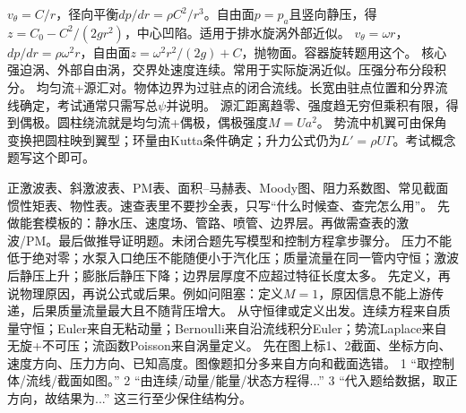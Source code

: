 $v_\theta=C/r$，径向平衡$dp/dr=\rho C^2/r^3$。自由面$p=p_a$且竖向静压，得$z=C_0-C^2/(2gr^2)$，中心凹陷。适用于排水旋涡外部近似。
$v_\theta=\omega r$，$dp/dr=\rho\omega^2r$，自由面$z=\omega^2r^2/(2g)+C$，抛物面。容器旋转题用这个。
核心强迫涡、外部自由涡，交界处速度连续。常用于实际旋涡近似。压强分布分段积分。
均匀流+源汇对。物体边界为过驻点的闭合流线。长宽由驻点位置和分界流线确定，考试通常只需写总$\psi$并说明。
源汇距离趋零、强度趋无穷但乘积有限，得到偶极。圆柱绕流就是均匀流+偶极，偶极强度$M=Ua^2$。
势流中机翼可由保角变换把圆柱映到翼型；环量由Kutta条件确定；升力公式仍为$L'=\rho U\Gamma$。考试概念题写这个即可。

正激波表、斜激波表、PM表、面积--马赫表、Moody图、阻力系数图、常见截面惯性矩表、物性表。速查表里不要抄全表，只写“什么时候查、查完怎么用”。
先做能套模板的：静水压、速度场、管路、喷管、边界层。再做需查表的激波/PM。最后做推导证明题。未闭合题先写模型和控制方程拿步骤分。
压力不能低于绝对零；水泵入口绝压不能随便小于汽化压；质量流量在同一管内守恒；激波后静压上升；膨胀后静压下降；边界层厚度不应超过特征长度太多。
先定义，再说物理原因，再说公式或后果。例如问阻塞：定义$M=1$，原因信息不能上游传递，后果质量流量最大且不随背压增大。
从守恒律或定义出发。连续方程来自质量守恒；Euler来自无粘动量；Bernoulli来自沿流线积分Euler；势流Laplace来自无旋+不可压；流函数Poisson来自涡量定义。
先在图上标1、2截面、坐标方向、速度方向、压力方向、已知高度。图像题扣分多来自方向和截面选错。
1 “取控制体/流线/截面如图。” 2 “由连续/动量/能量/状态方程得...” 3 “代入题给数据，取正方向，故结果为...” 这三行至少保住结构分。

